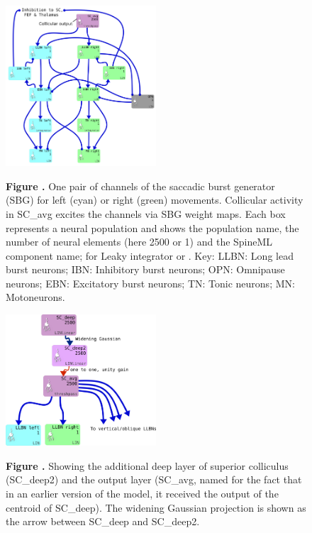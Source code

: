 \documentclass{frontiersSCNS}
\begin{document}
\begin{figure}[htb!]
\begin{center}
\includegraphics[width=0.5\textwidth]{./figures/Brain_Stem_1channel.png}
\end{center}
\textbf{\label{sbg} Figure .}
{ One pair of channels of the saccadic burst generator (SBG) for left
(cyan) or right (green) movements. Collicular activity in SC\_avg
excites the channels via SBG weight maps. Each box represents a neural
population and shows the population name, the number of neural
elements (here 2500 or 1) and the SpineML component name;  for
Leaky integrator or . Key: LLBN: Long lead burst
neurons; IBN: Inhibitory burst neurons; OPN: Omnipause neurons; EBN:
Excitatory burst neurons; TN: Tonic neurons; MN: Motoneurons.}
\end{figure}

\begin{figure}[htb!]
\begin{center}
\includegraphics[width=0.5\textwidth]{./figures/SC_to_brainstem.png}
\end{center}
\textbf{\label{scdeep} Figure .}
{ Showing the additional deep layer of superior colliculus (SC\_deep2)
and the output layer (SC\_avg, named for the fact that in an earlier
version of the model, it received the output of the centroid of
SC\_deep).  The widening Gaussian projection is shown as the arrow
between SC\_deep and SC\_deep2.}
\end{figure}
\end{document}

